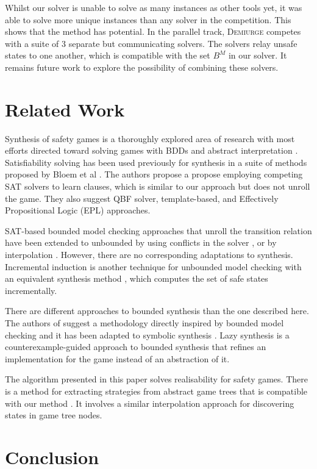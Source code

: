 \documentclass{llncs}
\begin{document}
Whilst our solver is unable to solve as many instances as other tools yet, it
was able to solve more unique instances than any solver in the competition.
This shows that the method has potential. In the parallel track,
\textsc{Demiurge} competes with a suite of 3 separate but communicating
solvers. The solvers relay unsafe states to one another, which is compatible
with the set $B^M$ in our solver. It remains future work to explore the
possibility of combining these solvers.

\section{Related Work}

Synthesis of safety games is a thoroughly explored area of research with most
efforts directed toward solving games with BDDs \cite{burch1990} and abstract
interpretation \cite{walker2014,brenguier2014}. Satisfiability solving has been used
previously for synthesis in a suite of methods proposed by Bloem et al
\cite{bloem2014}. The authors propose a propose employing competing SAT solvers
to learn clauses, which is similar to our approach but does not unroll the
game. They also suggest QBF solver, template-based, and Effectively
Propositional Logic (EPL) approaches.

SAT-based bounded model checking approaches that unroll the transition relation
have been extended to unbounded by using conflicts in the solver
\cite{mcmillan2002}, or by interpolation \cite{mcmillan2003}. However, there
are no corresponding adaptations to synthesis. Incremental induction
\cite{bradley2011} is another technique for unbounded model checking with an
equivalent synthesis method \cite{morgenstern2013}, which computes the set of
safe states incrementally.

There are different approaches to bounded synthesis than the one described
here. The authors of \cite{finkbeiner2013} suggest a methodology directly
inspired by bounded model checking and it has been adapted to symbolic
synthesis \cite{ehlers2010}. Lazy synthesis \cite{finkbeiner2012} is a
counterexample-guided approach to bounded synthesis that refines an
implementation for the game instead of an abstraction of it.

The algorithm presented in this paper solves realisability for safety games.
There is a method for extracting strategies from abstract game trees that is
compatible with our method \cite{een2015}. It involves a similar interpolation
approach for discovering states in game tree nodes.

\section{Conclusion}




\end{document}
